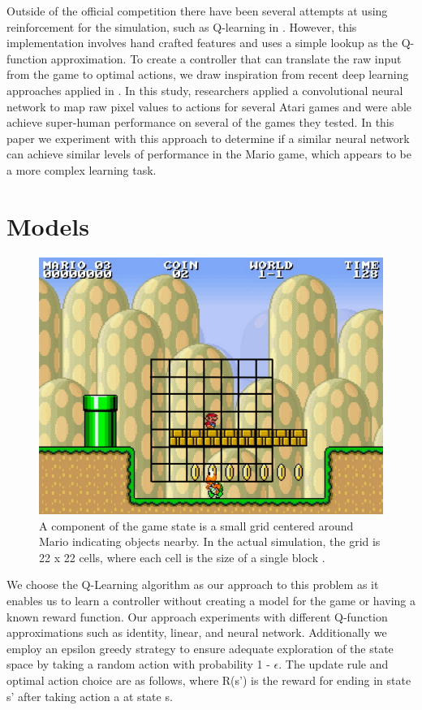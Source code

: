 \documentclass[12pt]{article}
\begin{document}
Outside of the official competition there have been several attempts at using reinforcement for the simulation, such as Q-learning in \cite{liao2012cs229}. However, this implementation involves hand crafted features and uses a simple lookup as the Q-function approximation. To create a controller that can translate the raw input from the game to optimal actions, we draw inspiration from recent deep learning approaches applied in \cite{mnih2013playing}. In this study, researchers applied a convolutional neural network to map raw pixel values to actions for several Atari games and were able achieve super-human performance on several of the games they tested. In this paper we experiment with this approach to determine if a similar neural network can achieve similar levels of performance in the Mario game, which appears to be a more complex learning task.

\section{Models}

\begin{figure}[h]
\centering
\includegraphics[scale=0.5]{imgs/mario_grid}
\caption{A component of the game state is a small grid centered around Mario indicating objects nearby. In the actual simulation, the grid is 22 x 22 cells, where each cell is the size of a single block \cite{karakovskiy2012mario}.}
\label{mario_grid}
\end{figure}

We choose the Q-Learning algorithm as our approach to this problem as it enables us to learn a controller without creating a model for the game or having a known reward function. Our approach experiments with different Q-function approximations such as identity, linear, and neural network. Additionally we employ an epsilon greedy strategy to ensure adequate exploration of the state space by taking a random action with probability 1 - $\epsilon$. The update rule and optimal action choice are as follows, where R(s') is the reward for ending in state s' after taking action a at state s.
\end{document}
